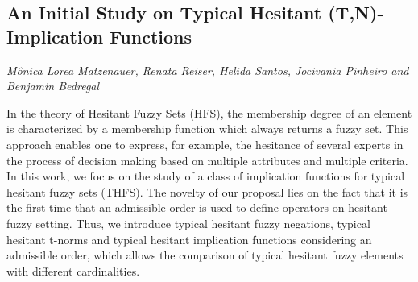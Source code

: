 \documentclass[../booklet.tex]{subfiles}
\begin{document}
\subsection[An Initial Study on Typical Hesitant (T,N)-Implication Functions. {\it Mônica Lorea Matzenauer, Renata Reiser, Helida Santos, Jocivania Pinheiro and Benjamin Bedregal}]{An Initial Study on Typical Hesitant (T,N)-Implication Functions}
    

\begin{center}
  {\it Mônica Lorea Matzenauer, Renata Reiser, Helida Santos, Jocivania Pinheiro and Benjamin Bedregal}
\end{center}

\vskip 0.8cm


In the theory of Hesitant Fuzzy Sets (HFS), the membership degree of an element is characterized by a membership function which always returns a fuzzy set. This approach enables one to express, for example, the hesitance of several experts in the process of decision making based on multiple attributes and multiple criteria. In this work, we focus on the study of a class of implication functions for typical hesitant fuzzy sets (THFS). The novelty of our proposal lies on the fact that it is the first time that an admissible order is used to define operators on hesitant fuzzy setting. Thus, we introduce  typical hesitant fuzzy negations, typical hesitant t-norms and  typical hesitant implication functions considering an admissible order, which allows the comparison of typical hesitant fuzzy elements with different cardinalities.


\end{document}
